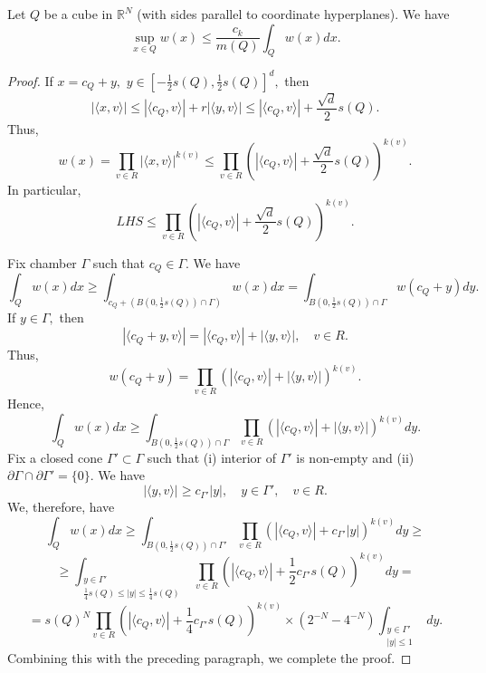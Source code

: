 \documentclass{amsart}
\begin{document}
\begin{lemma}\label{for reverse holder first lemma} Let $Q$ be a cube in $\mathbb{R}^N$ (with sides parallel to coordinate hyperplanes). We have
$$\sup_{x\in Q}w(x)\leq \frac{c_k}{m(Q)}\int_Qw(x)dx.$$
\end{lemma}
\begin{proof} If $x=c_Q+y,$ $y\in [-\frac12s(Q),\frac12s(Q)]^d,$ then
$$|\langle x,v\rangle|\leq |\langle c_Q,v\rangle|+r|\langle y,v\rangle|\leq |\langle c_Q,v\rangle|+\frac{\sqrt{d}}{2}s(Q).$$
Thus,
$$w(x)=\prod_{v\in R}|\langle x,v\rangle|^{k(v)}\leq\prod_{v\in R}(|\langle c_Q,v\rangle|+\frac{\sqrt{d}}{2}s(Q))^{k(v)}.$$
In particular,
$$LHS\leq \prod_{v\in R}(|\langle c_Q,v\rangle|+\frac{\sqrt{d}}{2}s(Q))^{k(v)}.$$

Fix chamber $\Gamma$ such that $c_Q\in\Gamma.$ We have
$$\int_Qw(x)dx\geq\int_{c_Q+(B(0,\frac12s(Q))\cap\Gamma)}w(x)dx=\int_{B(0,\frac12s(Q))\cap\Gamma}w(c_Q+y)dy.$$
If $y\in\Gamma,$ then
$$|\langle c_Q+y,v\rangle|=|\langle c_Q,v\rangle|+|\langle y,v\rangle|,\quad v\in R.$$
Thus,
$$w(c_Q+y)=\prod_{v\in R}(|\langle c_Q,v\rangle|+|\langle y,v\rangle|)^{k(v)}.$$
Hence,
$$\int_Qw(x)dx\geq\int_{B(0,\frac12s(Q))\cap\Gamma}\prod_{v\in R}(|\langle c_Q,v\rangle|+|\langle y,v\rangle|)^{k(v)}dy.$$
Fix a closed cone $\Gamma'\subset\Gamma$ such that (i) interior of $\Gamma'$ is non-empty and (ii) $\partial\Gamma\cap\partial\Gamma'=\{0\}.$ We have
$$|\langle y,v\rangle|\geq c_{\Gamma'}|y|,\quad y\in\Gamma',\quad v\in R.$$
We, therefore, have
$$\int_Qw(x)dx\geq\int_{B(0,\frac12s(Q))\cap\Gamma'}\prod_{v\in R}(|\langle c_Q,v\rangle|+c_{\Gamma'}|y|)^{k(v)}dy\geq$$
$$\geq \int_{\substack{y\in\Gamma'\\ \frac14s(Q)\leq|y|\leq \frac14s(Q)}}\prod_{v\in R}(|\langle c_Q,v\rangle|+\frac12c_{\Gamma'}s(Q))^{k(v)}dy=$$
$$=s(Q)^N\prod_{v\in R}(|\langle c_Q,v\rangle|+\frac14c_{\Gamma'}s(Q))^{k(v)}\times (2^{-N}-4^{-N})\int_{\substack{y\in\Gamma'\\ |y|\leq1}}dy.$$
Combining this with the preceding paragraph, we complete the proof.
\end{proof}
\end{document}
